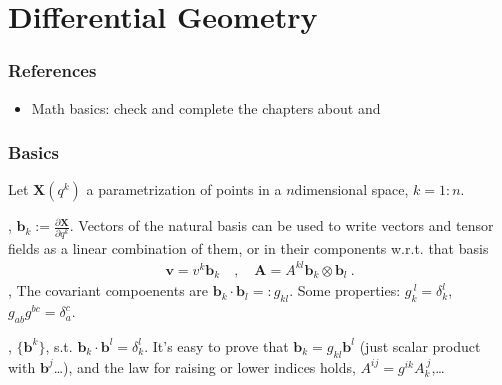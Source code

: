 \documentclass[letterpaper,10pt,english]{jupyterBook}
\begin{document}
\sphinxstepscope


\section{Differential Geometry}
\label{\detokenize{ch/relativity-general/differential-geometry:differential-geometry}}\label{\detokenize{ch/relativity-general/differential-geometry:relativity-general-notes-differential-geometry}}\label{\detokenize{ch/relativity-general/differential-geometry::doc}}\subsubsection*{References}
\begin{itemize}
\item {} 
\sphinxAtStartPar
Math basics:  check and complete the chapters about  and 

\end{itemize}


\subsubsection*{Basics}

\sphinxAtStartPar
Let \(\mathbf{X}(q^k)\) a parametrization of points in a \(n\)\sphinxhyphen{}dimensional space, \(k = 1:n\).

\sphinxAtStartPar
{}, \(\mathbf{b}_k := \frac{\partial \mathbf{X}}{\partial q^k}\). Vectors of the natural basis can be used to write vectors and tensor fields as a linear combination of them, or in their components w.r.t. that basis
\begin{equation*}
\begin{split}\mathbf{v} = v^k \mathbf{b}_k \quad , \quad \mathbf{A} = A^{kl} \mathbf{b}_k \otimes \mathbf{b}_l \ .\end{split}
\end{equation*}
\sphinxAtStartPar
{}, The covariant compoenents are \(\mathbf{b}_k \cdot \mathbf{b}_l =: g_{kl}\). Some properties: \(g_{k}^{\ l} = \delta_{k}^{l}\), \(g_{ab} g^{bc} = \delta_{a}^{c}\).

\sphinxAtStartPar
{}, \(\{ \mathbf{b}^k \}\), s.t. \(\mathbf{b}_k \cdot \mathbf{b}^l = \delta_k^l\). It’s easy to prove that \(\mathbf{b}_k = g_{kl} \mathbf{b}^l\) (just scalar product with \(\mathbf{b}^j\)…), and the law for raising or lower indices holds, \(A^{ij} = g^{ik} A_{k}^{\ j}\),…
\end{document}
